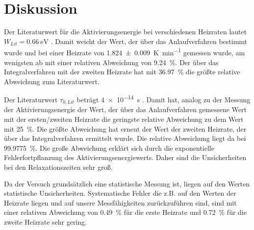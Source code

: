 \section{Diskussion}
\label{sec:Diskussion}

Der Literaturwert für die Aktivierungsenergie bei verschiedenen Heizraten lautet {$W_{Lit} = \SI{0.66}{\electronvolt}$} \cite{lit}. Damit weicht der Wert, der über das Anlaufverfahren bestimmt wurde und bei einer Heizrate von \SI{1.824(9)}{\kelvin\per\minute} gemessen wurde, am wenigsten ab mit einer relativen Abweichung von \SI{9.24}{\percent}. Der über das Integralverfahren mit der zweiten Heizrate hat mit \SI{36.97}{\percent} die größte relative Abweichung zum Literaturwert.

Der Literaturwert $\tau_{0, Lit}$ beträgt \SI{4e-14}{\second} \cite{lit}. Damit hat, analog zu der Messung der Aktivierungsenergie der Wert, der über das Anlaufverfahren gemessene Wert mit der ersten/zweiten Heizrate die geringste relative Abweichung zu dem Wert mit \SI{25}{\percent}. 
Die größte Abweichung hat erneut der Wert der zweiten Heizrate, der über das Integralverfahren ermittelt wurde. 
Die relative Abweichung liegt da bei \SI{99.9775}{\percent}. 
Die große Abweichung erklärt sich durch die exponentielle Fehlerfortpflanzung des Aktivierungsenergiewerts. Daher sind die Unsicherheiten bei den Relaxationszeiten sehr groß.

Da der Versuch grundsätzlich eine statistische Messung ist, liegen auf den Werten statistische Unsicherheiten. Systematische Fehler die z.B. auf den Werten der Heizrate liegen und auf unsere Messfähigkeiten zurückzuführen sind, sind mit einer relativen Abweichung von \SI{0.49}{\percent} für die erste Heizrate und \SI{0.72}{\percent} für die zweite Heizrate sehr gering.